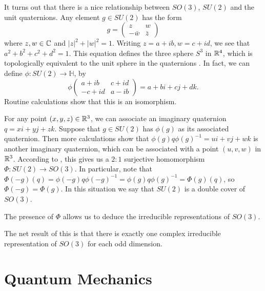 \documentclass[a4paper]{article}
\begin{document}
It turns out that there is a nice relationship between $SO(3)$, $SU(2)$ and the unit quaternions. Any element $g \in SU(2)$ has the form
$$g = \begin{pmatrix}z & w \\ -\bar{w} & \bar{z}\end{pmatrix}$$
where $z, w \in \mathbb{C}$ and $|z|^2 + |w|^2 = 1$. Writing $z = a + i b, w = c + i d$, we see that $a^2 + b^2 + c^2 + d^2 = 1$. This equation defines the three sphere $S^3$ in $\mathbb{R}^4$, which is topologically equivalent to the unit sphere in the quaternions \cite{wiki}. In fact, we can define $\phi: SU(2) \to \mathbb{H}$, by 
$$\phi\begin{pmatrix}a + i b & c + i d \\ -c + i d & a - i b\end{pmatrix} = a + bi + cj + dk.$$
Routine calculations show that this is an isomorphism. 

For any point $(x, y, z) \in \mathbb{R}^3$, we can associate an imaginary quaternion $q = xi + yj + zk$. Suppose that $g \in SU(2)$ has $\phi(g)$ as its associated quaternion. Then more calculations show that $\phi(g)q\phi(g)^{-1} = u i + v j + w k$ is another imaginary quaternion, which can be associated with a point $(u, v, w)$ in $\mathbb{R}^3$. According to \cite{wiki}, this gives us a $2: 1$ surjective homomorphism $\Phi : SU(2) \to SO(3)$. In particular, note that $\Phi(-g)(q) = \phi(-g)q\phi(-g)^{-1} = \phi(g)q\phi(g)^{-1} = \Phi(g)(q)$, so $\Phi(-g) = \Phi(g)$. In this situation we say that $SU(2)$ is a double cover of $SO(3)$.

The presence of $\Phi$ allows us to deduce the irreducible representations of $SO(3)$. 

The net result of this is that there is exactly one complex irreducible representation of $SO(3)$ for each odd dimension.

\section{Quantum Mechanics}
\end{document}
